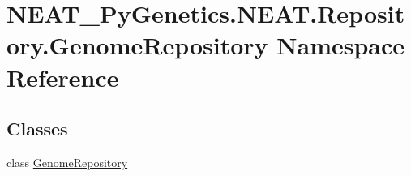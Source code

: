 \hypertarget{namespaceNEAT__PyGenetics_1_1NEAT_1_1Repository_1_1GenomeRepository}{}\section{N\+E\+A\+T\+\_\+\+Py\+Genetics.\+N\+E\+A\+T.\+Repository.\+Genome\+Repository Namespace Reference}
\label{namespaceNEAT__PyGenetics_1_1NEAT_1_1Repository_1_1GenomeRepository}
\subsection*{Classes}
\begin{DoxyCompactItemize}
\item 
class \hyperlink{classNEAT__PyGenetics_1_1NEAT_1_1Repository_1_1GenomeRepository_1_1GenomeRepository}{Genome\+Repository}
\end{DoxyCompactItemize}
